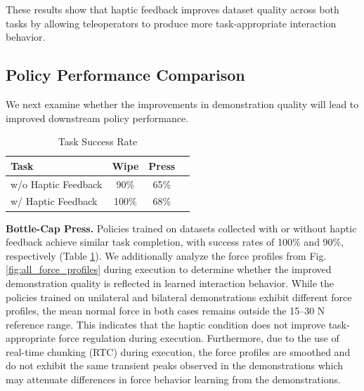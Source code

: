 \documentclass[letterpaper, 10 pt, conference]{ieeeconf}  %
\begin{document}

These results show that haptic feedback improves dataset quality across both tasks by allowing teleoperators to produce more task-appropriate interaction behavior. 


\subsection{Policy Performance Comparison}
We next examine whether the improvements in demonstration quality will lead to improved downstream policy performance. %

\begin{table}[t]
\centering
\caption{Task Success Rate}
\label{tab:task_success}
\begin{tabular}{lccc}
\toprule
\textbf{Task} & \textbf{Wipe} & \textbf{Press} \\
\midrule
w/o Haptic Feedback   & 90\% & 65\%\\
w/ Haptic Feedback & 100\% & 68\%\\
\bottomrule
\end{tabular}
\end{table}

\textbf{Bottle-Cap Press.}  Policies trained on datasets collected with or without haptic feedback achieve similar task completion, with success rates of 100\% and 90\%, respectively (Table \ref{tab:task_success}). We additionally analyze the force profiles from Fig. \ref{fig:all_force_profiles} during execution to determine whether the improved demonstration quality is reflected in learned interaction behavior. While the policies trained on unilateral and bilateral demonstrations exhibit different force profiles, the mean normal force in both cases remains outside the 15--30 N reference range. This indicates that the haptic condition does not improve task-appropriate force regulation during execution. Furthermore, due to the use of real-time chunking (RTC) during execution, the force profiles are smoothed and do not exhibit the same transient peaks observed in the demonstrations which may attenuate differences in force behavior learning from the demonstrations.
\end{document}
